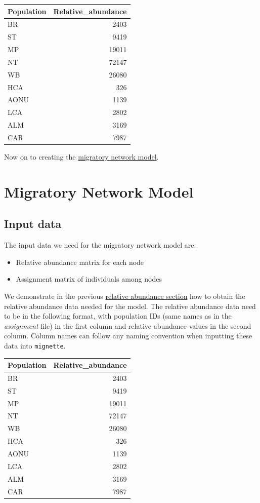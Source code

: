 \documentclass[
]{book}
\providecommand{\tightlist}{%
  \setlength{\itemsep}{0pt}\setlength{\parskip}{0pt}}
\begin{document}
\begin{tabular}{l|r}
\hline
Population & Relative\_abundance\\
\hline
BR & 2403\\
\hline
ST & 9419\\
\hline
MP & 19011\\
\hline
NT & 72147\\
\hline
WB & 26080\\
\hline
HCA & 326\\
\hline
AONU & 1139\\
\hline
LCA & 2802\\
\hline
ALM & 3169\\
\hline
CAR & 7987\\
\hline
\end{tabular}

Now on to creating the \protect\hyperlink{connectivity}{migratory network model}.

\hypertarget{connectivity}{%
\chapter{Migratory Network Model}\label{connectivity}}

\hypertarget{input-data}{%
\section{Input data}\label{input-data}}

The input data we need for the migratory network model are:

\begin{itemize}
\tightlist
\item
  Relative abundance matrix for each node
\item
  Assignment matrix of individuals among nodes
\end{itemize}

We demonstrate in the previous \protect\hyperlink{abundance}{relative abundance section} how to obtain the relative abundance data needed for the model. The relative abundance data need to be in the following format, with population IDs (same names as in the \emph{assignment} file) in the first column and relative abundance values in the second column. Column names can follow any naming convention when inputting these data into \texttt{mignette}.

\begin{tabular}{l|r}
\hline
Population & Relative\_abundance\\
\hline
BR & 2403\\
\hline
ST & 9419\\
\hline
MP & 19011\\
\hline
NT & 72147\\
\hline
WB & 26080\\
\hline
HCA & 326\\
\hline
AONU & 1139\\
\hline
LCA & 2802\\
\hline
ALM & 3169\\
\hline
CAR & 7987\\
\hline
\end{tabular}
\end{document}
